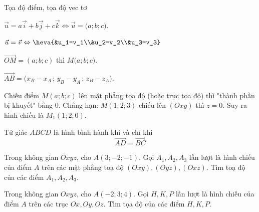 \begin{dang}{Tọa độ điểm, tọa độ vec tơ}
	\begin{listEX}[2]
		\item [\ding{172}] $\vec{u}=a\vec{i}+b\vec{j}+c\vec{k} \Leftrightarrow \vec{u}=\big(a;b;c\big)$.
		\item [\ding{173}] $\vec{u}=\vec{v} \Leftrightarrow \heva{&u_1=v_1\\&u_2=v_2\\&u_3=v_3}$
		\item [\ding{174}] $\vec{OM}=(a;b;c)$ thì $M\big(a;b;c\big)$.
		\item [\ding{175}] $\vec{AB}=\big(x_B-x_A\,;\,y_B-y_A\,;\,z_B-z_A \big).$
		\item [\ding{176}] Chiếu điểm $M(a;b;c)$ lên mặt phẳng tọa độ (hoặc trục tọa độ) thì "thành phần bị khuyết" bằng $0$. Chẳng hạn: $M(1;2;3)$ chiếu lên $(Oxy)$ thì $z=0$. Suy ra hình chiếu là $M_1(1;2;0)$.
		\item [\ding{177}] Tứ giác $ABCD$ là hình bình hành khi và chỉ khi $$\vec{AD}=\vec{BC}$$
	\end{listEX}
\end{dang}
\setcounter{vd}{0}
\begin{vd}
	Trong không gian $Oxyz$, cho $A(3 ;-2 ;-1)$. Gọi $ A_1, A_2, A_3$ lần lượt là hình chiếu của điểm $A$ trên các mặt phẳng toạ độ $(Oxy),(Oyz),(Oxz)$. Tìm toạ độ của các điểm $ A_1, A_2, A_3$.
\end{vd}
\begin{vd}
	Trong không gian $Oxyz$, cho $A(-2;3;4)$. Gọi $H, K, P$ lần lượt là hình chiếu của điểm $A$ trên các trục $Ox, Oy, Oz$. Tìm tọa độ của các điểm $H,K,P$.
\end{vd}
